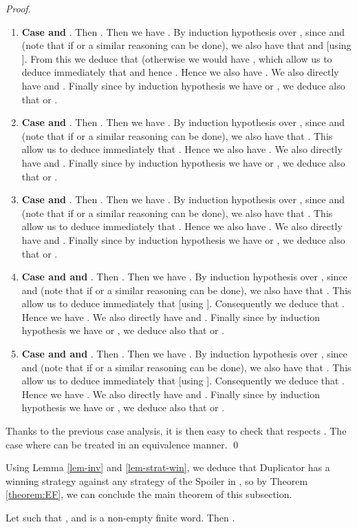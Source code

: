 \begin{proof}
\begin{enumerate}
\item \textbf{Case  and }. Then . Then we have . By induction hypothesis over , since  and  (note that if  or  a similar reasoning can be done),  we also have that   and  [using ]. From this we deduce that  (otherwise we would have , which allow us to deduce immediately that   and hence  . Hence we also have  . We also directly have  and . Finally since by induction hypothesis we have  or , we deduce also that  or .
\item \textbf{Case  and }. Then . Then we have . By induction hypothesis over , since  and  (note that if  or  a similar reasoning can be done),  we also have that  . This allow us to deduce immediately that  . Hence we also have  . We also directly have  and . Finally since by induction hypothesis we have  or , we deduce also that  or .
\item \textbf{Case  and }. Then . Then we have . By induction hypothesis over , since  and  (note that if  or  a similar reasoning can be done),  we also have that  . This allow us to deduce immediately that  . Hence we also have  . We also directly have  and . Finally since by induction hypothesis we have  or , we deduce also that  or .
\item \textbf{Case  and  and  }. Then . Then we have . By induction hypothesis over , since  and  (note that if  or  a similar reasoning can be done),  we also have that   . This allow us to deduce immediately that    [using ]. Consequently we deduce that . Hence we have  . We also directly have  and . Finally since by induction hypothesis we have  or , we deduce also that  or .
\item \textbf{Case  and  and  }. Then . Then we have . By induction hypothesis over , since  and  (note that if  or  a similar reasoning can be done),  we also have that   . This allow us to deduce immediately that    [using ]. Consequently we deduce that . Hence we have  . We also directly have  and . Finally since by induction hypothesis we have  or , we deduce also that  or .
 \end{enumerate}
 Thanks to the previous case analysis, it is then easy to check that  respects . The case where  can be treated in an equivalence manner. \qed



\end{proof}
Using Lemma \ref{lem-inv} and \ref{lem-strat-win}, we deduce that Duplicator has a winning strategy against any strategy of the Spoiler in , so by Theorem \ref{theorem:EF}, we can conclude the main theorem of this subsection.
\begin{theorem}
\label{theorem:stuttering}
Let   such that ,  and  is a non-empty finite word. Then .
\end{theorem}

